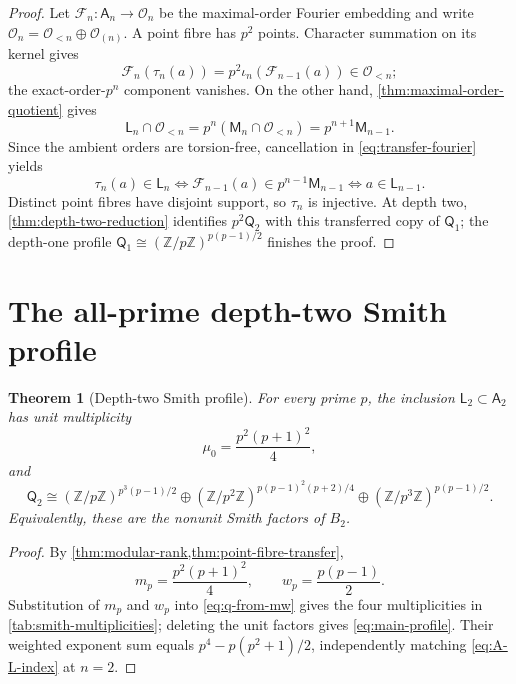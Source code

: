 \documentclass[12pt,a4paper]{article}
\newtheorem{theorem}{Theorem}[section]
\theoremstyle{definition}
\newcommand{\Z}{\mathbb Z}
\newcommand{\A}{\mathsf A}
\newcommand{\OO}{\mathcal O}
\newcommand{\LL}{\mathsf L}
\newcommand{\QQ}{\mathsf Q}
\begin{document}
\begin{proof}
Let $\mathcal F_n:\A_n\to\OO_n$ be the maximal-order Fourier embedding and
write $\OO_n=\OO_{<n}\oplus\OO_{(n)}$.  A point fibre has $p^2$ points.
Character summation on its kernel gives
\begin{equation}\label{eq:transfer-fourier}
 \mathcal F_n(\tau_n(a))=
 p^2\iota_n(\mathcal F_{n-1}(a))\in\OO_{<n};
\end{equation}
the exact-order-$p^n$ component vanishes.  On the other hand,
\cref{thm:maximal-order-quotient} gives
\[
 \LL_n\cap\OO_{<n}
 =p^n(\mathsf M_n\cap\OO_{<n})
 =p^{n+1}\mathsf M_{n-1}.
\]
Since the ambient orders are torsion-free, cancellation in
\eqref{eq:transfer-fourier} yields
\[
 \tau_n(a)\in\LL_n
 \Longleftrightarrow
 \mathcal F_{n-1}(a)\in p^{n-1}\mathsf M_{n-1}
 \Longleftrightarrow a\in\LL_{n-1}.
\]
Distinct point fibres have disjoint support, so $\tau_n$ is injective.
At depth two, \cref{thm:depth-two-reduction} identifies $p^2\QQ_2$ with this transferred
copy of $\QQ_1$; the depth-one profile
$\QQ_1\cong(\Z/p\Z)^{p(p-1)/2}$ finishes the proof.
\end{proof}

\section{The all-prime depth-two Smith profile}\label{sec:S06}

\begin{theorem}[Depth-two Smith profile]
\label{thm:depth-two-smith-profile}
For every prime $p$, the inclusion $\LL_2\subset\A_2$ has unit
multiplicity
\[
 \mu_0=\frac{p^2(p+1)^2}{4},
\]
and
\begin{equation}\label{eq:main-profile}
 \QQ_2\cong
 (\Z/p\Z)^{p^3(p-1)/2}\oplus
 (\Z/p^2\Z)^{p(p-1)^2(p+2)/4}\oplus
 (\Z/p^3\Z)^{p(p-1)/2}.
\end{equation}
Equivalently, these are the nonunit Smith factors of $B_2$.
\end{theorem}

\begin{proof}
By \cref{thm:modular-rank,thm:point-fibre-transfer},
\[
 m_p=\frac{p^2(p+1)^2}{4},\qquad
 w_p=\frac{p(p-1)}2.
\]
Substitution of $m_p$ and $w_p$ into \eqref{eq:q-from-mw} gives the four
multiplicities in \cref{tab:smith-multiplicities}; deleting the unit factors gives
\eqref{eq:main-profile}.  Their weighted exponent sum equals
$p^4-p(p^2+1)/2$, independently matching \eqref{eq:A-L-index} at $n=2$.
\end{proof}
\end{document}
